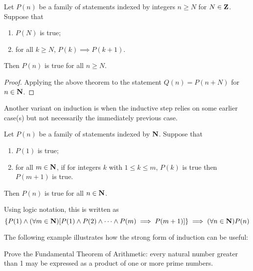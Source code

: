 \begin{corollary}
Let $P(n)$ be a family of statements indexed by integers $n \ge N$ for $N\in\mathbf Z$. Suppose that 
\begin{enumerate}[label=(\roman*)]
\item $P(N)$ is true;
\item for all $k \ge N$, $P(k) \implies P(k+1)$. 
\end{enumerate}
Then $P(n)$ is true for all $n \ge N$.
\end{corollary}

\begin{proof}
Applying the above theorem to the statement $Q(n)=P(n+N)$ for $n\in\mathbf N$.
\end{proof}

Another variant on induction is when the inductive step relies on some earlier case(s) but not necessarily the immediately previous case.

\begin{theorem}
Let $P(n)$ be a family of statements indexed by $\mathbf N$. Suppose that
\begin{enumerate}[label=(\roman*)]
\item $P(1)$ is true;
\item for all $m \in \mathbf N$, if for integers $k$ with $1 \le k \le m$, $P(k)$ is true then $P(m+1)$ is true.
\end{enumerate}
Then $P(n)$ is true for all $n \in \mathbf N$.
\end{theorem}

Using logic notation, this is written as
\[ \{P(1) \land (\forall m \in \mathbf N) [P(1) \land P(2) \land \cdots \land P(m) \implies P(m+1)]\} \implies (\forall n \in \mathbf N)P(n) \]

The following example illustrates how the strong form of induction can be useful:

\begin{exercise}
Prove the Fundamental Theorem of Arithmetic: every natural number greater than 1 may be expressed as a product of one or more prime numbers.
\end{exercise}

